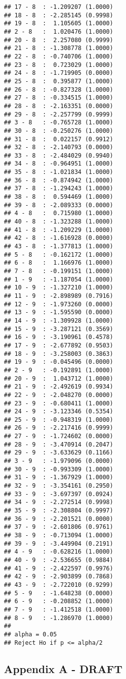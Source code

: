 \documentclass[12pt,]{article}
\begin{document}
\begin{verbatim}
## 17 - 8  : -1.209207 (1.0000)
## 18 - 8  : -2.285145 (0.9998)
## 19 - 8  :  1.105605 (1.0000)
## 2 - 8   :  1.020476 (1.0000)
## 20 - 8  :  2.257080 (0.9999)
## 21 - 8  : -1.308778 (1.0000)
## 22 - 8  : -0.740706 (1.0000)
## 23 - 8  :  0.723029 (1.0000)
## 24 - 8  : -1.719905 (0.0000)
## 25 - 8  :  0.395877 (1.0000)
## 26 - 8  : -0.827328 (1.0000)
## 27 - 8  : -0.334515 (1.0000)
## 28 - 8  : -2.163351 (0.0000)
## 29 - 8  : -2.257799 (0.9999)
## 3 - 8   : -0.765728 (1.0000)
## 30 - 8  : -0.250276 (1.0000)
## 31 - 8  :  0.022157 (0.9912)
## 32 - 8  : -2.140793 (0.0000)
## 33 - 8  : -2.484029 (0.9940)
## 34 - 8  : -0.964951 (1.0000)
## 35 - 8  : -1.021834 (1.0000)
## 36 - 8  : -0.874942 (1.0000)
## 37 - 8  : -1.294243 (1.0000)
## 38 - 8  :  0.594469 (1.0000)
## 39 - 8  : -2.089333 (0.0000)
## 4 - 8   :  0.715980 (1.0000)
## 40 - 8  : -1.323288 (1.0000)
## 41 - 8  : -1.209229 (1.0000)
## 42 - 8  : -1.616928 (0.0000)
## 43 - 8  : -1.377813 (1.0000)
## 5 - 8   : -0.162172 (1.0000)
## 6 - 8   :  1.166976 (1.0000)
## 7 - 8   : -0.199151 (1.0000)
## 1 - 9   : -1.187054 (1.0000)
## 10 - 9  : -1.327210 (1.0000)
## 11 - 9  : -2.898989 (0.7916)
## 12 - 9  : -1.973260 (0.0000)
## 13 - 9  : -1.595590 (0.0000)
## 14 - 9  : -1.309928 (1.0000)
## 15 - 9  : -3.287121 (0.3569)
## 16 - 9  : -3.190961 (0.4578)
## 17 - 9  : -2.677892 (0.9503)
## 18 - 9  : -3.258003 (0.3863)
## 19 - 9  : -0.045496 (0.0000)
## 2 - 9   : -0.192891 (1.0000)
## 20 - 9  :  1.043712 (1.0000)
## 21 - 9  : -2.492619 (0.9934)
## 22 - 9  : -2.048270 (0.0000)
## 23 - 9  : -0.680411 (1.0000)
## 24 - 9  : -3.123346 (0.5354)
## 25 - 9  : -0.948319 (1.0000)
## 26 - 9  : -2.217416 (0.9999)
## 27 - 9  : -1.724602 (0.0000)
## 28 - 9  : -3.470914 (0.2047)
## 29 - 9  : -3.633629 (0.1166)
## 3 - 9   : -1.979096 (0.0000)
## 30 - 9  : -0.993309 (1.0000)
## 31 - 9  : -1.367929 (1.0000)
## 32 - 9  : -3.354161 (0.2950)
## 33 - 9  : -3.697397 (0.0924)
## 34 - 9  : -2.272514 (0.9998)
## 35 - 9  : -2.308804 (0.9997)
## 36 - 9  : -2.201521 (0.0000)
## 37 - 9  : -2.601806 (0.9761)
## 38 - 9  : -0.713094 (1.0000)
## 39 - 9  : -3.449904 (0.2191)
## 4 - 9   : -0.628216 (1.0000)
## 40 - 9  : -2.536655 (0.9884)
## 41 - 9  : -2.422597 (0.9976)
## 42 - 9  : -2.903899 (0.7868)
## 43 - 9  : -2.722010 (0.9299)
## 5 - 9   : -1.648238 (0.0000)
## 6 - 9   : -0.208852 (1.0000)
## 7 - 9   : -1.412518 (1.0000)
## 8 - 9   : -1.286970 (1.0000)
## 
## alpha = 0.05
## Reject Ho if p <= alpha/2
\end{verbatim}

\subsection{Appendix A - DRAFT}\label{appendix-a---draft}
\end{document}
